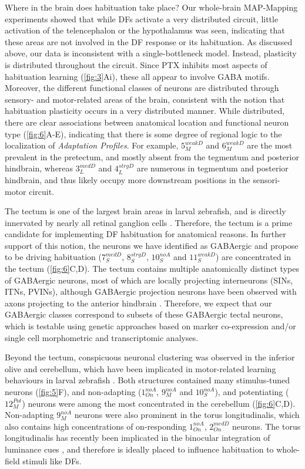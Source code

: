 \documentclass[9pt,lineno]{RandlettLab_elife}
\begin{document}
Where in the brain does habituation take place?  Our whole-brain MAP-Mapping experiments showed that while DFs activate a very distributed circuit, little activation of the telencephalon or the hypothalamus was seen, indicating that these areas are not involved in the DF response or its habituation.  As discussed above, our data is inconsistent with a single-bottleneck model. Instead, plasticity is distributed throughout the circuit. Since PTX inhibits most aspects of habituation learning (\autoref{fig:3}Ai), these all appear to involve GABA motifs. Moreover, the different functional classes of neurons are distributed through sensory- and motor-related areas of the brain, consistent with the notion that habituation plasticity occurs in a very distributed manner. While distributed, there are clear associations between anatomical location and functional neuron type (\autoref{fig:6}A-E), indicating that there is some degree of regional logic to the localization of \emph{Adaptation Profiles}. For example, $5_{M}^{weakD}$ and $6_{M}^{weakD}$ are the most prevalent in the pretectum, and mostly absent from the tegmentum and posterior hindbrain, whereas $3_{L}^{medD}$ and $4_{L}^{strgD}$ are numerous in tegmentum and posterior hindbrain, and thus likely occupy more downstream positions in the sensori-motor circuit. 

The tectum is one of the largest brain areas in larval zebrafish, and is directly innervated by nearly all retinal ganglion cells \cite{Robles2014-kz}. Therefore, the tectum is a prime candidate for implementing DF habituation for anatomical reasons. In further support of this notion, the neurons we have identified as GABAergic and propose to be driving habituation ($7_{S}^{medD}$, $8_{S}^{strgD}$,  $10_{S}^{noA}$ and $11_{S}^{weakD}$) are concentrated in the tectum (\autoref{fig:6}C,D). The tectum contains multiple anatomically distinct types of GABAergic neurons, most of which are locally projecting interneurons (SINs, ITNs, PVINs), although GABAergic projection neurons have been observed with axons projecting to the anterior hindbrain \cite{Gebhardt2019-xd, Martin2022-iz, Nevin2010-ev, Robles2011-ty}. Therefore, we expect that our GABAergic classes correspond to subsets of these GABAergic tectal neurons, which is testable using genetic approaches based on marker co-expression and/or single cell morphometric and transcriptomic analyses.

Beyond the tectum, conspicuous neuronal clustering was observed in the inferior olive and cerebellum, which have been implicated in motor-related learning behaviours in larval zebrafish \cite{Ahrens2012-zb, Lin2020-dv, Markov2021-rc}. Both structures contained many stimulus-tuned neurons (\autoref{fig:5}F), and non-adapting ($1_{On}^{noA}$,  $9_{M}^{noA}$ and $10_{S}^{noA}$), and potentiating ($12_{M}^{Pot}$) neurons were among the most concentrated in the cerebellum (\autoref{fig:6}C,D). Non-adapting $9_{M}^{noA}$ neurons were also prominent in the torus longitudinalis, which also contains high concentrations of on-responding $1_{On}^{noA}$, $2_{On}^{medD}$ neurons. The torus longitudinalis has recently been implicated in the binocular integration of luminance cues \cite{Tesmer2022-tk}, and therefore is ideally placed to influence habituation to whole-field stimuli like DFs. 
\end{document}
